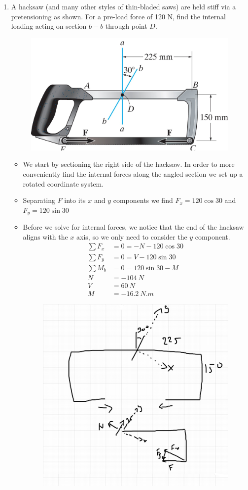 \documentclass[12pt, oneside]{article}
\begin{document}
\begin{enumerate}
	\item %
		A hacksaw (and many other styles of thin-bladed saws) are held stiff via a pretensioning as shown.
		For a pre-load force of 120 N, find the internal loading acting on section $b-b$ through point $D$.
		\begin{figure}[H]
			\centering
			\includegraphics[width=0.6\linewidth]{hacksaw}
			\label{fig:hacksaw}
		\end{figure}
		\begin{itemize}
			\item We start by sectioning the right side of the hacksaw. In order to more conveniently find the internal forces along the angled section we set up a rotated coordinate system.
			\item Separating $F$ into its $x$ and $y$ components we find $F_x = 120 \cos 30$ and $F_y = 120 \sin 30$
			\item Before we solve for internal forces, we notice that the end of the hacksaw aligns with the $x$ axis, so we only need to consider the $y$ component.
			\begin{align*}
				\sum F_x &= 0 = -N - 120 \cos 30 \\
				\sum F_y &= 0 = V - 120 \sin 30 \\
				\sum M_b &= 0 = 120 \sin 30 - M\\
				N &= \SI{-104}{N}\\
				V &= \SI{60}{N}\\
				M &= \SI{-16.2}{N.m}
			\end{align*}
			\begin{figure}[H]
				\centering
				\includegraphics[width=0.7\linewidth]{hw1-2}
			\end{figure}
		\end{itemize}


\end{enumerate}
\end{document}
